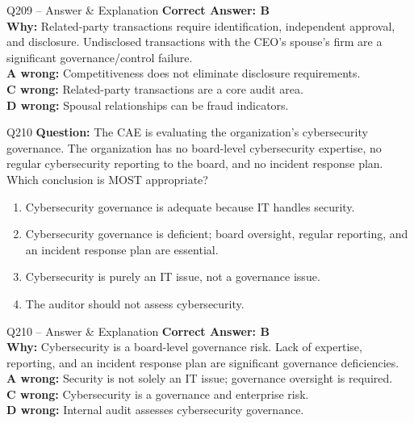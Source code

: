 \documentclass[aspectratio=169,10pt]{beamer}
\begin{document}
	\begin{frame}[t]{Q209 -- Answer \& Explanation}
		\small
		\textbf{Correct Answer: B} \\[4pt]
		\textbf{Why:} Related-party transactions require identification, independent approval, and disclosure. Undisclosed transactions with the CEO's spouse's firm are a significant governance/control failure. \\[4pt]
		\textbf{A wrong:} Competitiveness does not eliminate disclosure requirements. \\[2pt]
		\textbf{C wrong:} Related-party transactions are a core audit area. \\[2pt]
		\textbf{D wrong:} Spousal relationships can be fraud indicators.
	\end{frame}
	
	\begin{frame}[t]{Q210}
		\small
		\textbf{Question:} The CAE is evaluating the organization's cybersecurity governance. The organization has no board-level cybersecurity expertise, no regular cybersecurity reporting to the board, and no incident response plan. Which conclusion is MOST appropriate?
		\begin{enumerate}[label=\Alph*.,itemsep=1pt,topsep=2pt]
			\item Cybersecurity governance is adequate because IT handles security.
			\item Cybersecurity governance is deficient; board oversight, regular reporting, and an incident response plan are essential.
			\item Cybersecurity is purely an IT issue, not a governance issue.
			\item The auditor should not assess cybersecurity.
		\end{enumerate}
	\end{frame}
	
	\begin{frame}[t]{Q210 -- Answer \& Explanation}
		\small
		\textbf{Correct Answer: B} \\[4pt]
		\textbf{Why:} Cybersecurity is a board-level governance risk. Lack of expertise, reporting, and an incident response plan are significant governance deficiencies. \\[4pt]
		\textbf{A wrong:} Security is not solely an IT issue; governance oversight is required. \\[2pt]
		\textbf{C wrong:} Cybersecurity is a governance and enterprise risk. \\[2pt]
		\textbf{D wrong:} Internal audit assesses cybersecurity governance.
	\end{frame}
	
\end{document}
